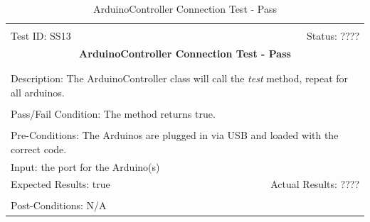 \documentclass[11pt]{article}
\begin{document}
\begin{center}
\begin{table}[H]
\begin{tabular}{|l r|}\hline&\\[-2mm]
	Test ID: SS13	&Status: ????\\[-3mm]
	\multicolumn{2}{|c|}{\textbf{\large{ArduinoController Connection Test - Pass}}}\\&\\\hline&\\[-3mm]
	\multicolumn{2}{|p{\textwidth}|}{Description: The ArduinoController class will call the \textit{test} method, repeat for all arduinos.}\\[1mm]\hline&\\[-3mm]
	\multicolumn{2}{|p{\textwidth}|}{Pass/Fail Condition: The method returns true.}\\[1mm]\hline&\\[-3mm]
	\multicolumn{2}{|p{\textwidth}|}{Pre-Conditions: The Arduinos are plugged in via USB and loaded with the correct code.}\\[4mm]
	\multicolumn{2}{|p{\textwidth}|}{Input: the port for the Arduino(s)}\\[2mm]\hline
	\multicolumn{1}{|p{0.49\textwidth}}{Expected Results: true}	&\multicolumn{1}{|p{0.45\textwidth}|}{Actual Results: ????}\\\hline&\\[-3mm]
	\multicolumn{2}{|p{\textwidth}|}{Post-Conditions: N/A}\\\hline
\end{tabular}
\caption{ArduinoController Connection Test - Pass}
\end{table}
\end{center}
\end{document}
